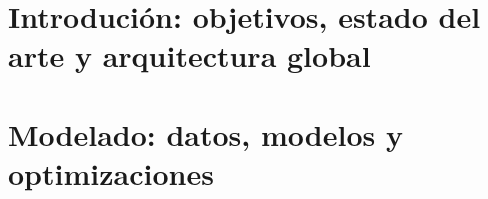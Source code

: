 \documentclass[12pt,a4paper,twoside]{book}
\begin{document}

\newpage

\newpage

\pagestyle{fancy}
\renewcommand{\chaptermark}[1]{ \markboth{#1}{}}
\renewcommand{\sectionmark}[1]{\markright{ \thesection.\ #1}}
\lhead[\fancyplain{}{\bfseries\thepage}]{\fancyplain{}{\bfseries\rightmark}}
\rhead[\fancyplain{}{\bfseries\leftmark}]{\fancyplain{}{\bfseries\thepage}}
\cfoot{}

\cleardoublepage
{}
{}
\tableofcontents
\cleardoublepage
{}
{}
\listoffigures
\cleardoublepage
{}

\thispagestyle{empty}


\pagestyle{fancy}
\renewcommand{\chaptermark}[1]{ \markboth{#1}{}}
\renewcommand{\sectionmark}[1]{\markright{ \thesection.\ #1}}
\lhead[\fancyplain{}{\bfseries\thepage}]{\fancyplain{}{\bfseries\rightmark}}
\rhead[\fancyplain{}{\bfseries\leftmark}]{\fancyplain{}{\bfseries\thepage}}
\cfoot{}

\onehalfspacing

















\part{Introdución: objetivos, estado del arte y arquitectura global}




\part{Modelado: datos, modelos y optimizaciones}
%

%

%
\end{document}
